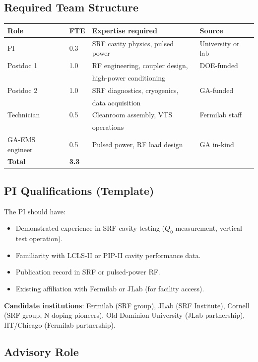 \documentclass[11pt]{article}
\newcommand{\Qzero}{Q_0}
\begin{document}
\subsection{Required Team Structure}

\begin{center}
\begin{tabular}{llll}
\toprule
Role & FTE & Expertise required & Source \\
\midrule
PI & 0.3 & SRF cavity physics, pulsed power & University or lab \\
Postdoc 1 & 1.0 & RF engineering, coupler design, & DOE-funded \\
& & high-power conditioning & \\
Postdoc 2 & 1.0 & SRF diagnostics, cryogenics, & GA-funded \\
& & data acquisition & \\
Technician & 0.5 & Cleanroom assembly, VTS & Fermilab staff \\
& & operations & \\
GA-EMS engineer & 0.5 & Pulsed power, RF load design & GA in-kind \\
\midrule
\textbf{Total} & \textbf{3.3} & & \\
\bottomrule
\end{tabular}
\end{center}

\subsection{PI Qualifications (Template)}

The PI should have:
\begin{itemize}[nosep]
  \item Demonstrated experience in SRF cavity testing ($\Qzero$
    measurement, vertical test operation).
  \item Familiarity with LCLS-II or PIP-II cavity performance data.
  \item Publication record in SRF or pulsed-power RF.
  \item Existing affiliation with Fermilab or JLab (for facility access).
\end{itemize}

\textbf{Candidate institutions}: Fermilab (SRF group), JLab (SRF
Institute), Cornell (SRF group, N-doping pioneers), Old Dominion
University (JLab partnership), IIT/Chicago (Fermilab partnership).

\subsection{Advisory Role}
\end{document}
